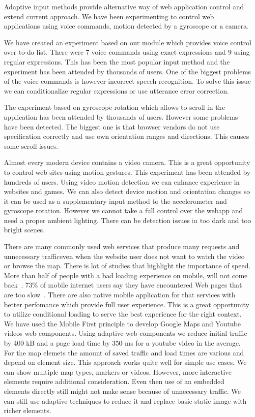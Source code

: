 \documentclass{iitsrc}
\begin{document}

Adaptive input methods provide alternative way of web application control and extend current approach. We have been experimenting to control web applications using voice commands, motion detected by a gyroscope or a camera. 

We have created an experiment based on our module which provides voice control over to-do list. There were 7 voice commands using exact expressions and 9 using regular expressions. This has been the most popular input method and the experiment has been attended by thousands of users. One of the biggest problems of the voice commands is however incorrect speech recognition. To solve this issue we can conditionalize regular expressions or use utterance error correction.

The experiment based on gyroscope rotation which allows to scroll in the application has been attended by thousands of users. However some problems have been detected. The biggest one is that browser vendors do not use specification correctly and use own orientation ranges and directions. This causes some scroll issues.

Almost every modern device contains a video camera. This is a great opportunity to control web sites using motion gestures. This experiment has been attended by hundreds of users. Using video motion detection we can enhance experience in websites and games. We can also detect device motion and orientation changes so it can be used as a supplementary input method to the accelerometer and gyroscope rotation. However we cannot take a full control over the webapp and need a proper ambient lighting. There can be detection issues in too dark and too bright scenes.


There are many commonly used web services that produce many requests and unnecessary trafficeven when the website user does not want to watch the video or browse the map. There is lot of studies that highlight the importance of speed. More than half of people with a bad loading experience on mobile, will not come back~\cite{performancebrowsernetworking}. 73\% of mobile internet users say they have encountered Web pages that are too slow~\cite{pagespeed}. There are also native mobile application for that services with better perfomance which provide full user experience. This is a great opportunity to utilize conditional loading to serve the best experience for the right context. We have used the Mobile First principle to develop Google Maps and Youtube videos web components.
Using adaptive web components we reduce initial traffic by 400 kB and a page load time by 350 ms for a youtube video in the average. For the map elemets the amount of saved traffic and load times are various and depend on element size. This approach works quite well for simple use cases. We can show multiple map types, markers or videos. However, more interactive elements require additional consideration. Even then use of an embedded elements directly still might not make sense because of unnecessary traffic. We can still use adaptive techniques to reduce it and replace basic static image with richer elements.
\end{document}

